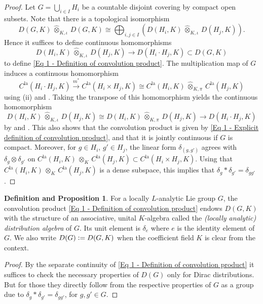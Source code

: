 \documentclass[a4paper, reqno, 10pt]{amsart}
\theoremstyle{definition}
\newtheorem{definitionproposition}[theorem]{Definition and Proposition}
\numberwithin{equation}{section}
\newcommand{\botimes}[1]{{\,\otimes_{#1}\,}}
\newcommand{\defeq}{\vcentcolon=}
\newcommand{\indcotimes}{{\,\widehat{\otimes}_{K,\iota}\,}}
\newcommand{\la}{{\mathrm{la}}}
\newcommand{\lra}{\longrightarrow}
\newcommand{\projcotimes}{{\,\widehat{\otimes}_{K,\pi}\,}}
\begin{document}
\begin{proof}
	Let $G = \bigcup_{i \in I} H_i$ be a countable disjoint covering by compact open subsets. 
	Note that there is a topological isomorphism \cite[Cor.\ 1.2.14]{Kohlhaase05InvDistpAdicAnGrp}
	\begin{equation*}
		D(G,K) \indcotimes D(G,K) \cong \bigoplus_{i,j \in I} \left( D(H_i,K) \indcotimes D(H_j,K) \right) .
	\end{equation*}	
	Hence it suffices to define continuous homomorphisms 
	\begin{equation*}
		D(H_i,K) \indcotimes D(H_j,K) \lra D(H_i \cdot H_j, K) \subset D(G,K)
	\end{equation*}
	to define \eqref{Eq 1 - Definition of convolution product}.
	The multiplication map of $G$ induces a continuous homomorphism 
	\begin{equation*}
		C^\la(H_i \cdot  H_j,K) \overset{m^\ast}{\lra} C^\la(H_i\times H_j, K) \cong  C^\la(H_i,K) \projcotimes C^\la(H_j,K)
	\end{equation*}
	using  (ii) and .
	Taking the transpose of this homomorphism yields the continuous homomorphism
	\begin{equation*}
		D(H_i,K) \indcotimes D(H_j,K) \cong D(H_i,K) \projcotimes D(H_j,K)  \lra D(H_i \cdot H_j, K)
	\end{equation*}
	by \cite[Prop.\ 17.6]{Schneider02NonArchFunctAna} and \cite[Prop.\ 20.13]{Schneider02NonArchFunctAna}.
	This also shows that the convolution product is given by \eqref{Eq 1 - Explicit definition of convolution product}, and that it is jointly continuous if $G$ is compact.
	Moreover, for $g \in H_i$, $g'\in H_j$, the linear form $\delta_{(g,g')}$ agrees with $\delta_g \otimes \delta_{g'}$ on $C^\la(H_i,K) \botimes{K} C^\la(H_j,K) \subset C^\la(H_i \times H_j,K)$. 
	Using that $C^\la(H_i,K)\botimes{K} C^\la(H_j,K)$ is a dense subspace, this implies that $\delta_g \ast \delta_{g'} = \delta_{gg'}$.
\end{proof}



\begin{definitionproposition}\label{Def 1 - Definition of distribution algebra}
	For a locally $L$-analytic Lie group $G$, the convolution product \eqref{Eq 1 - Definition of convolution product} endows $D(G,K)$ with the structure of an associative, unital $K$-algebra called the \textit{(locally analytic) distribution algebra} of $G$.
	Its unit element is $\delta_e$ where $e$ is the identity element of $G$.
	We also write $D(G) \defeq D(G,K)$ when the coefficient field $K$ is clear from the context.
\end{definitionproposition}
\begin{proof}	
	By the separate continuity of \eqref{Eq 1 - Definition of convolution product} it suffices to check the necessary properties of $D(G)$ only for Dirac distributions.
	But for those they directly follow from the respective properties of $G$ as a group due to $\delta_g \ast \delta_{g'} = \delta_{gg'}$, for $g, g'\in G$.
\end{proof}
\end{document}
